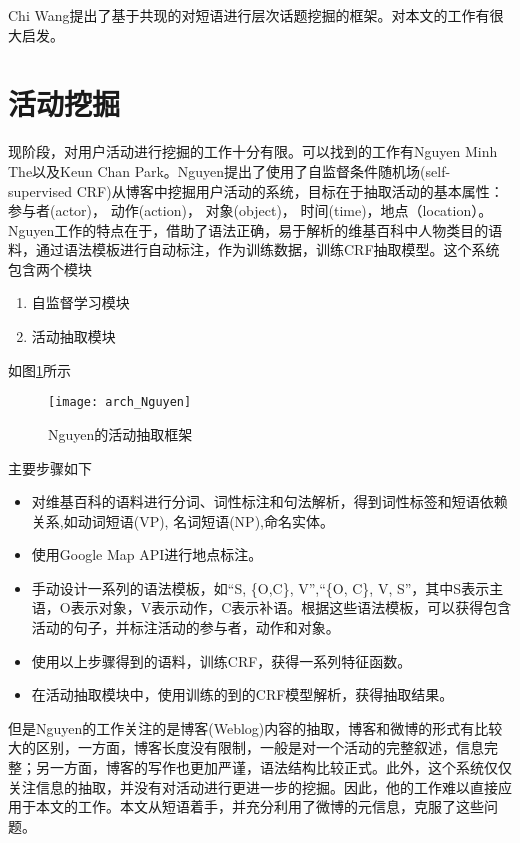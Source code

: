 Chi Wang\cite{wang2013phrase}提出了基于共现的对短语进行层次话题挖掘的框架。对本文的工作有很大启发。

\section{活动挖掘}
现阶段，对用户活动进行挖掘的工作十分有限。可以找到的工作有Nguyen Minh The以及Keun Chan Park\cite{park2010detecting}。Nguyen\cite{the2010automatic}\cite{kawamura2010human}提出了使用了自监督条件随机场(self-supervised CRF)从博客中挖掘用户活动的系统，目标在于抽取活动的基本属性：参与者(actor)， 动作(action)， 对象(object)， 时间(time)，地点（location）。Nguyen工作的特点在于，借助了语法正确，易于解析的维基百科中人物类目的语料，通过语法模板进行自动标注，作为训练数据，训练CRF抽取模型。这个系统包含两个模块
\begin{enumerate}
\item 自监督学习模块
\item 活动抽取模块
\end{enumerate}
如图\ref{fig:nguyen_frameword}所示
\begin{figure}[!h]
\centering
\texttt{[image: arch\_Nguyen]}
\caption{Nguyen的活动抽取框架}
\label{fig:nguyen_frameword}
\end{figure}

主要步骤如下
\begin{itemize}
\item 对维基百科的语料进行分词、词性标注和句法解析，得到词性标签和短语依赖关系,如动词短语(VP), 名词短语(NP),命名实体。
\item 使用Google Map API进行地点标注。
\item 手动设计一系列的语法模板，如``S, \{O,C\}, V'',``\{O, C\}, V, S''，其中S表示主语，O表示对象，V表示动作，C表示补语。根据这些语法模板，可以获得包含活动的句子，并标注活动的参与者，动作和对象。
\item 使用以上步骤得到的语料，训练CRF，获得一系列特征函数。
\item 在活动抽取模块中，使用训练的到的CRF模型解析，获得抽取结果。
\end{itemize}

但是Nguyen的工作关注的是博客(Weblog)内容的抽取，博客和微博的形式有比较大的区别，一方面，博客长度没有限制，一般是对一个活动的完整叙述，信息完整；另一方面，博客的写作也更加严谨，语法结构比较正式。此外，这个系统仅仅关注信息的抽取，并没有对活动进行更进一步的挖掘。因此，他的工作难以直接应用于本文的工作。本文从短语着手，并充分利用了微博的元信息，克服了这些问题。

